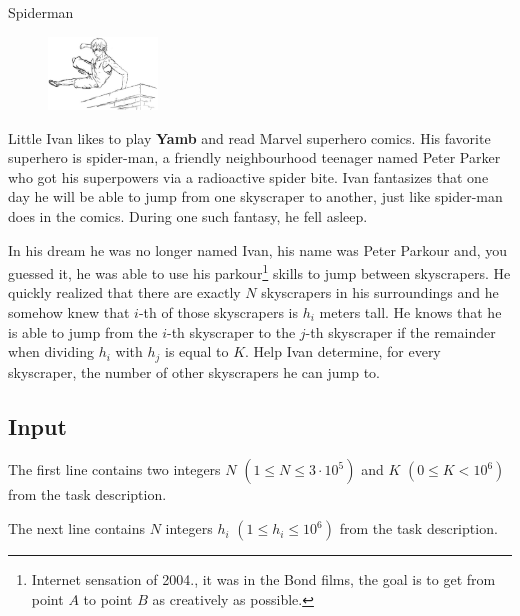 \begin{statement}[
  problempoints=70,
  timelimit=1 second,
  memorylimit=512 MiB,
]{Spiderman}

\setlength\intextsep{-0.1cm}
\begin{figure}
\centering
\includegraphics[width=0.26\textwidth]{img/spiderman.png}
\end{figure}

Little Ivan likes to play \textbf{Yamb} and read Marvel superhero comics.
His favorite superhero is spider-man, a friendly neighbourhood teenager
named Peter Parker who got his superpowers via a radioactive spider bite.
Ivan fantasizes that one day he will be able to jump from one skyscraper to
another, just like spider-man does in the comics. During one such fantasy, he
fell asleep.

In his dream he was no longer named Ivan, his name was Peter Parkour and, you
guessed it, he was able to use his parkour\footnote{Internet sensation of
2004., it was in the Bond films, the goal is to get from point $A$ to point
$B$ as creatively as possible.} skills to jump between skyscrapers. He
quickly realized that there are exactly $N$ skyscrapers in his surroundings
and he somehow knew that $i$-th of those skyscrapers is $h_i$ meters tall. He
knows that he is able to jump from the $i$-th skyscraper to the $j$-th
skyscraper if the remainder when dividing $h_i$ with $h_j$ is equal to $K$.
Help Ivan determine, for every skyscraper, the number of other skyscrapers he
can jump to.

\subsection*{Input}
The first line contains two integers $N$ $(1 \le N \le 3\cdot10^5)$ and $K$
$(0 \le K < 10^6)$ from the task description.

The next line contains $N$ integers $h_i$ $(1 \le h_i \le 10^6)$ from the task
description.


\end{statement}
